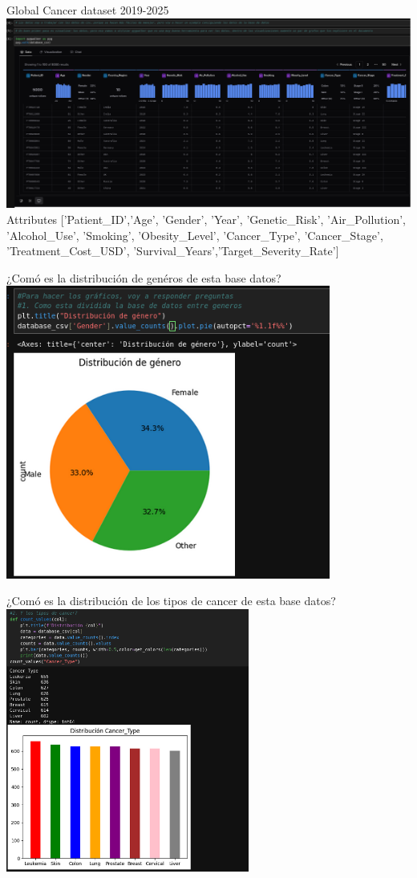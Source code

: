 \documentclass{beamer}
\begin{document}
  \begin{frame}{Global Cancer dataset 2019-2025}
      \center
      \includegraphics[width=\textwidth]{../figures/img0.png}
      Attributes ['Patient\_ID','Age', 'Gender', 'Year', 'Genetic\_Risk', 'Air\_Pollution', 'Alcohol\_Use',
      'Smoking', 'Obesity\_Level', 'Cancer\_Type', 'Cancer\_Stage',
      'Treatment\_Cost\_USD', 'Survival\_Years','Target\_Severity\_Rate']
  \end{frame}
    \begin{frame}[fragile]{¿Comó es la distribución de genéros de esta base datos?}
        \center
    \includegraphics[width=0.8\textwidth]{../figures/img1.png}
    \end{frame}
    \begin{frame}[fragile]{¿Comó es la distribución de los tipos de cancer de esta base datos?}
        \center
    \includegraphics[width=0.6\textwidth]{../figures/img2.png}
    \end{frame}
\end{document}
